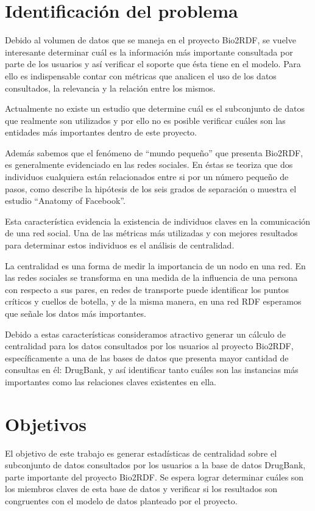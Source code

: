 \section{Identificación del problema}\label{sec:idpro}
Debido al volumen de datos que se maneja en el proyecto Bio2RDF, se vuelve
interesante determinar cuál es la información más importante consultada por
parte de los usuarios y así verificar el soporte que ésta tiene en el modelo. 
Para ello es indispensable contar con métricas que analicen el uso de los datos
consultados, la relevancia y la relación entre los mismos.

Actualmente no existe un estudio que determine cuál es el subconjunto de datos
que realmente son utilizados y por ello no es posible verificar cuáles son
las entidades más importantes dentro de este proyecto.

Además sabemos que el fenómeno de ``mundo pequeño'' que presenta Bio2RDF, es
generalmente evidenciado en las redes sociales. En éstas se 
teoriza que dos individuos cualquiera están relacionados entre si por un número
pequeño de pasos, como describe la hipótesis de los seis grados de separación o
muestra el estudio ``Anatomy of Facebook''\cite{ugander2011anatomy}.

Esta característica evidencia la existencia de individuos claves en la
comunicación de una red social. 
Una de las métricas más utilizadas y con mejores resultados para determinar
estos individuos es el análisis de centralidad.

La centralidad es una forma de medir la importancia de un nodo en una red.
En las redes sociales se transforma en una medida de la influencia de una
persona con respecto a sus pares, en redes de transporte puede identificar los
puntos críticos y cuellos de botella, y de la misma manera, en una red RDF
esperamos que señale los datos más importantes.

Debido a estas características consideramos atractivo generar un cálculo de
centralidad para los datos consultados por los usuarios al proyecto Bio2RDF,
específicamente a una de las bases de datos que presenta mayor cantidad de
consultas en él: DrugBank, y así identificar tanto cuáles son las
instancias más importantes como las relaciones claves existentes en ella.

\section{Objetivos}\label{sec:objs}

El objetivo de este trabajo es generar estadísticas de centralidad sobre el
subconjunto de datos consultados por los usuarios a la base de datos DrugBank,
parte importante del proyecto Bio2RDF.
Se espera lograr determinar cuáles son los miembros claves de esta base de datos
y verificar si los resultados son congruentes con el modelo de datos planteado
por el proyecto.

